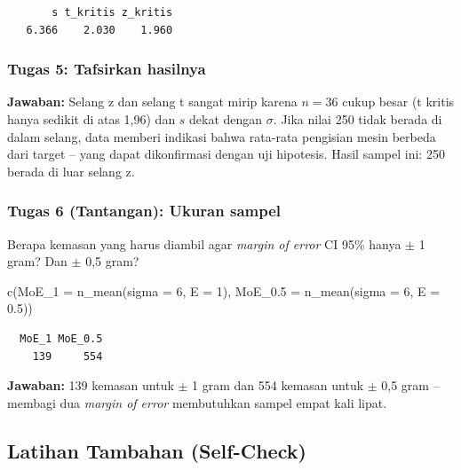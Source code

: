 \documentclass[
  indonesian,
  letterpaper,
]{book}
\newenvironment{Shaded}{\begin{snugshade}}{\end{snugshade}}
\newcommand{\AttributeTok}[1]{\textcolor[rgb]{0.40,0.45,0.13}{#1}}
\newcommand{\DecValTok}[1]{\textcolor[rgb]{0.68,0.00,0.00}{#1}}
\newcommand{\FloatTok}[1]{\textcolor[rgb]{0.68,0.00,0.00}{#1}}
\newcommand{\FunctionTok}[1]{\textcolor[rgb]{0.28,0.35,0.67}{#1}}
\newcommand{\NormalTok}[1]{\textcolor[rgb]{0.00,0.23,0.31}{#1}}
\begin{document}
\begin{verbatim}
       s t_kritis z_kritis 
   6.366    2.030    1.960 
\end{verbatim}

\subsubsection{Tugas 5: Tafsirkan
hasilnya}\label{tugas-5-tafsirkan-hasilnya}

\textbf{Jawaban:} Selang z dan selang t sangat mirip karena \(n = 36\)
cukup besar (t kritis hanya sedikit di atas 1,96) dan \(s\) dekat dengan
\(\sigma\). Jika nilai 250 tidak berada di dalam selang, data memberi
indikasi bahwa rata-rata pengisian mesin berbeda dari target -- yang
dapat dikonfirmasi dengan uji hipotesis. Hasil sampel ini: 250 berada di
luar selang z.

\subsubsection{Tugas 6 (Tantangan): Ukuran
sampel}\label{tugas-6-tantangan-ukuran-sampel}

Berapa kemasan yang harus diambil agar \emph{margin of error} CI 95\%
hanya \(\pm\) 1 gram? Dan \(\pm\) 0,5 gram?

\begin{Shaded}
\begin{Highlighting}[]
\FunctionTok{c}\NormalTok{(}\AttributeTok{MoE\_1 =} \FunctionTok{n\_mean}\NormalTok{(}\AttributeTok{sigma =} \DecValTok{6}\NormalTok{, }\AttributeTok{E =} \DecValTok{1}\NormalTok{), }\AttributeTok{MoE\_0.5 =} \FunctionTok{n\_mean}\NormalTok{(}\AttributeTok{sigma =} \DecValTok{6}\NormalTok{, }\AttributeTok{E =} \FloatTok{0.5}\NormalTok{))}
\end{Highlighting}
\end{Shaded}

\begin{verbatim}
  MoE_1 MoE_0.5 
    139     554 
\end{verbatim}

\textbf{Jawaban:} 139 kemasan untuk \(\pm\) 1 gram dan 554 kemasan untuk
\(\pm\) 0,5 gram -- membagi dua \emph{margin of error} membutuhkan
sampel empat kali lipat.

\subsection{Latihan Tambahan
(Self-Check)}\label{latihan-tambahan-self-check}
\end{document}
